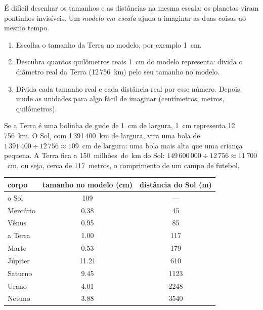 É difícil desenhar os tamanhos e as distâncias na mesma escala: os planetas
viram pontinhos invisíveis. Um \emph{modelo em escala} ajuda a imaginar as
duas coisas ao mesmo tempo.

\begin{method}\label{met:g6:earth-a-planet:scale-model}
\begin{enumerate}
  \item Escolha o tamanho da Terra no modelo, por exemplo 1~cm.
  \item Descubra quantos quilômetros reais 1~cm do modelo representa:
        divida o diâmetro real da Terra (12\,756~km) pelo seu tamanho no
        modelo.
  \item Divida cada tamanho real e cada distância real por esse número.
        Depois mude as unidades para algo fácil de imaginar (centímetros,
        metros, quilômetros).
\end{enumerate}
\end{method}

\begin{example}\label{ex:g6:earth-a-planet:marble}
Se a Terra é uma bolinha de gude de 1~cm de largura, 1~cm representa
12\,756~km. O Sol, com 1\,391\,400~km de largura, vira uma bola de $1\,391\,400 \div 12\,756 \approx
109$~cm de largura: uma bola mais alta que uma criança pequena. A Terra fica a 150~milhões~de~km do Sol:
$149\,600\,000 \div 12\,756 \approx 11\,700$~cm, ou seja, cerca de
117~metros, o comprimento de um campo de futebol.
\end{example}

\begin{center}\small
\begin{tabular}{|l|c|c|}
\hline
\textbf{corpo} & \textbf{tamanho no modelo (cm)} & \textbf{distância do Sol (m)} \\
\hline
o Sol & 109 & --- \\
Mercúrio & 0.38 & 45 \\
Vênus & 0.95 & 85 \\
a Terra & 1.00 & 117 \\
Marte & 0.53 & 179 \\
Júpiter & 11.21 & 610 \\
Saturno & 9.45 & 1123 \\
Urano & 4.01 & 2248 \\
Netuno & 3.88 & 3540 \\
\hline
\end{tabular}
\end{center}

